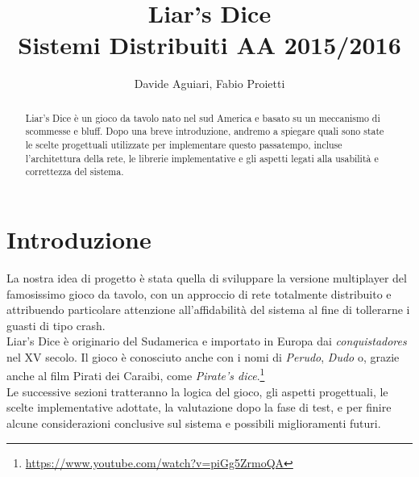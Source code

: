 \documentclass{llncs}
\begin{document}
	\mainmatter              %
	\title{Liar's Dice\\Sistemi Distribuiti AA 2015/2016}
	\author{Davide Aguiari, Fabio Proietti}
	\maketitle
	\begin{abstract}%
		Liar's Dice è un gioco da tavolo nato nel sud America e basato su un meccanismo di scommesse e bluff. Dopo una breve introduzione, andremo a spiegare quali sono state le scelte progettuali utilizzate per implementare questo passatempo, incluse l'architettura della rete, le librerie implementative e gli aspetti legati alla usabilità e correttezza del sistema.
		
	\end{abstract}

	\section{Introduzione}%
		La nostra idea di progetto è stata quella di sviluppare la versione multiplayer del  famosissimo gioco da tavolo, con un approccio di rete totalmente distribuito e attribuendo particolare attenzione all'affidabilità del sistema al fine di tollerarne i guasti di tipo crash. \\
		Liar's Dice \cite{wikiDice} è originario del Sudamerica e importato in Europa dai \textit{conquistadores} nel XV secolo. Il gioco è conosciuto anche con i nomi di \textit{Perudo}, \textit{Dudo} o, grazie anche al film Pirati dei Caraibi, come \textit{Pirate's dice}.\footnote[1]{\url{https://www.youtube.com/watch?v=piGg5ZrmoQA}}\\
		Le successive sezioni tratteranno la logica del gioco, gli aspetti progettuali, le scelte implementative adottate, la valutazione dopo la fase di test, e per finire alcune considerazioni conclusive sul sistema e possibili miglioramenti futuri.
\end{document}
